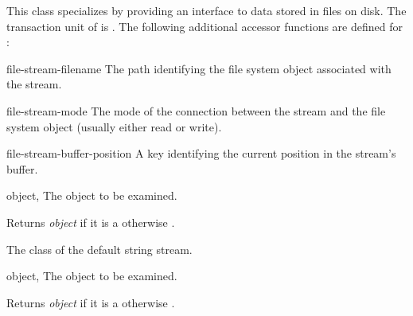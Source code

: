 \begin{optDefinition}
%
This class specializes  by providing an
interface to data stored in files on disk. The transaction unit of
 is . The following additional
accessor functions are defined for :
%
\begin{functions}
    \item[file-stream-filename] The path identifying the file system object
    associated with the stream.
    \item[file-stream-mode] The mode of the connection between the stream and
    the file system object (usually either read or write).
    \item[file-stream-buffer-position] A key identifying the current position in
    the stream's buffer.
\end{functions}

\begin{arguments}
  \item[object, \classref{object}] The object to be examined.
\end{arguments}
%
\result%
Returns {\em object\/} if it is a  otherwise \nil{}.

%
The class of the default string stream.

\begin{arguments}
    \item[object, \classref{object}] The object to be examined.
\end{arguments}
%
\result%
Returns {\em object\/} if it is a  otherwise \nil{}.



\end{optDefinition}
